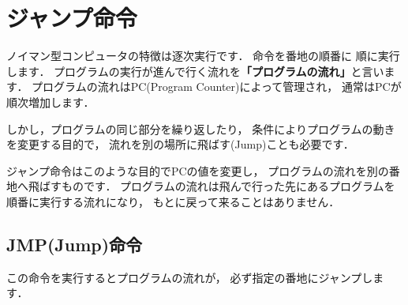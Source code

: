 \begin{center}
\end{center}


\newpage
\section{ジャンプ命令}
ノイマン型コンピュータの特徴は逐次実行です．
命令を番地の順番に
順に実行します．
プログラムの実行が進んで行く流れを{\bf 「プログラムの流れ」}と言います．
プログラムの流れはPC(Program Counter)によって管理され，
通常はPCが順次増加します．

しかし，プログラムの同じ部分を繰り返したり，
条件によりプログラムの動きを変更する目的で，
流れを別の場所に飛ばす(Jump)ことも必要です．

ジャンプ命令はこのような目的でPCの値を変更し，
プログラムの流れを別の番地へ飛ばすものです．
プログラムの流れは飛んで行った先にあるプログラムを順番に実行する流れになり，
もとに戻って来ることはありません．

\subsection{JMP(Jump)命令}
この命令を実行するとプログラムの流れが，
必ず指定の番地にジャンプします．

